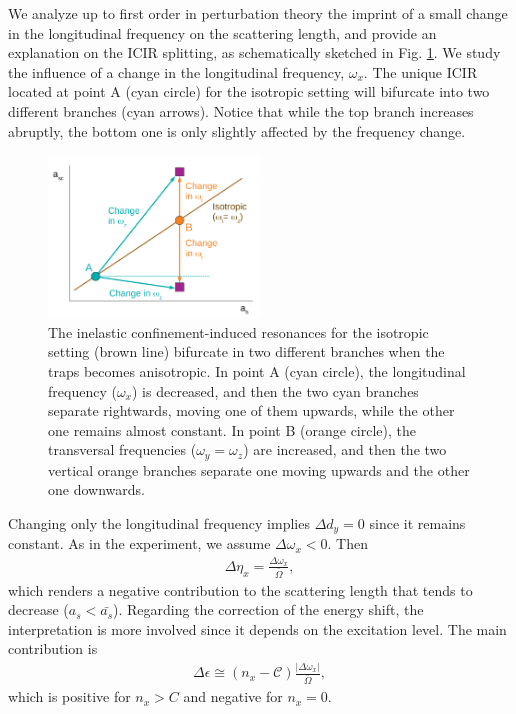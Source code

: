 \documentclass[aps,pre,twocolumn,superscriptaddress,showpacs]{revtex4-1}
\begin{document}
We analyze up to first order in perturbation theory the imprint of a small change in the longitudinal frequency on the scattering length, and provide an explanation on the ICIR splitting, as schematically sketched in Fig. \ref{fig:ICIR scheme}. We study the influence of a change in the longitudinal frequency, $\omega_x$. The unique ICIR located at point A (cyan circle) for the isotropic setting will bifurcate into two different branches (cyan arrows). Notice that while the top branch increases abruptly, the bottom one is only slightly affected by the frequency change.

\begin{figure}[htbp!]
\centering
\includegraphics[width=0.5\textwidth]{Figures/ICIR_scheme_Perturb}
\caption{The inelastic confinement-induced resonances for the isotropic setting (brown line) bifurcate in two different branches when the traps becomes anisotropic. In point A (cyan circle), the longitudinal frequency ($\omega_x$) is decreased, and then the two cyan branches separate rightwards, moving one of them upwards, while the other one remains almost constant. In point B (orange circle), the transversal frequencies ($\omega_y = \omega_z$) are increased, and then the two vertical orange branches separate one moving upwards and the other one downwards.}
\label{fig:ICIR scheme}
\end{figure}

Changing only the longitudinal frequency implies $\Delta d_y = 0$ since it remains constant. As in the experiment, we assume $\Delta \omega_x < 0$. Then
\begin{eqnarray}
\Delta \eta_x = \frac{\Delta \omega_x}{\bar{\Omega}},
\label{eq:Delta eta_x perturbed}
\end{eqnarray}
which renders a negative contribution to the scattering length that tends to decrease ($a_s < \bar{a_s}$). Regarding the correction of the energy shift, the interpretation is more involved since it depends on the excitation level. The main contribution is
\begin{eqnarray}
\Delta \epsilon \cong (n_x - \mathcal{C}) \frac{|\Delta \omega_x|}{\bar{\Omega}},
\label{eq:Delta shift perturbed}
\end{eqnarray}
which is positive for $n_x > C$ and negative for $n_x=0$. 
\end{document}
